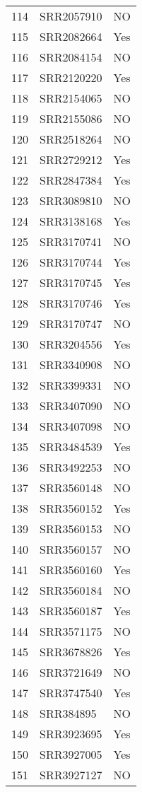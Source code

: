 \begin{table}[ht]
\begin{tabular}{rll}
  114 & SRR2057910 & NO \\ 
  115 & SRR2082664 & Yes \\ 
  116 & SRR2084154 & NO \\ 
  117 & SRR2120220 & Yes \\ 
  118 & SRR2154065 & NO \\ 
  119 & SRR2155086 & NO \\ 
  120 & SRR2518264 & NO \\ 
  121 & SRR2729212 & Yes \\ 
  122 & SRR2847384 & Yes \\ 
  123 & SRR3089810 & NO \\ 
  124 & SRR3138168 & Yes \\ 
  125 & SRR3170741 & NO \\ 
  126 & SRR3170744 & Yes \\ 
  127 & SRR3170745 & Yes \\ 
  128 & SRR3170746 & Yes \\ 
  129 & SRR3170747 & NO \\ 
  130 & SRR3204556 & Yes \\ 
  131 & SRR3340908 & NO \\ 
  132 & SRR3399331 & NO \\ 
  133 & SRR3407090 & NO \\ 
  134 & SRR3407098 & NO \\ 
  135 & SRR3484539 & Yes \\ 
  136 & SRR3492253 & NO \\ 
  137 & SRR3560148 & NO \\ 
  138 & SRR3560152 & Yes \\ 
  139 & SRR3560153 & NO \\ 
  140 & SRR3560157 & NO \\ 
  141 & SRR3560160 & Yes \\ 
  142 & SRR3560184 & NO \\ 
  143 & SRR3560187 & Yes \\ 
  144 & SRR3571175 & NO \\ 
  145 & SRR3678826 & Yes \\ 
  146 & SRR3721649 & NO \\ 
  147 & SRR3747540 & Yes \\ 
  148 & SRR384895 & NO \\ 
  149 & SRR3923695 & Yes \\ 
  150 & SRR3927005 & Yes \\ 
  151 & SRR3927127 & NO \\ 

\end{tabular}
\end{table}

